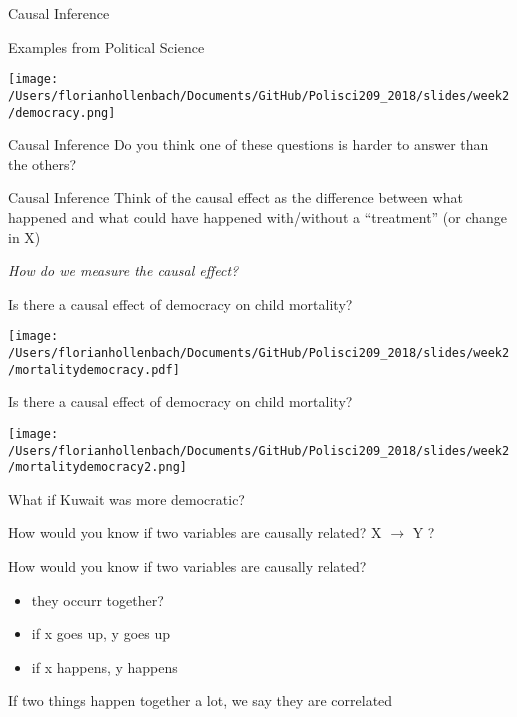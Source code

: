 \documentclass[presentation]{beamer}
\begin{document}
\begin{frame}[label={sec:org19d158c}]{Causal Inference}
\begin{block}{Examples from Political Science}
\begin{center}
\texttt{[image: /Users/florianhollenbach/Documents/GitHub/Polisci209\_2018/slides/week2/democracy.png]}
\end{center}
\end{block}
\end{frame}

\begin{frame}[label={sec:org6fd2cb8}]{Causal Inference}
Do you think one of these questions is harder to answer than the others?
\end{frame}

\begin{frame}[label={sec:org2395346}]{Causal Inference}
Think of the causal effect as the difference between what happened and what could have happened with/without a “treatment” (or change in X)

\emph{How do we measure the causal effect?}
\end{frame}

\begin{frame}[label={sec:org3ecdd11}]{Is there a causal effect of democracy on child mortality?}
\begin{center}
\texttt{[image: /Users/florianhollenbach/Documents/GitHub/Polisci209\_2018/slides/week2/mortalitydemocracy.pdf]}
\end{center}
\end{frame}

\begin{frame}[label={sec:org4b97a6d}]{Is there a causal effect of democracy on child mortality?}
\begin{center}
\texttt{[image: /Users/florianhollenbach/Documents/GitHub/Polisci209\_2018/slides/week2/mortalitydemocracy2.png]}
\end{center}
\begin{block}{What if Kuwait was more democratic?}
\end{block}
\end{frame}

\begin{frame}[label={sec:org2f4f3f6}]{How would you know if two variables are causally related?}
\LARGE{X $\rightarrow$ Y ?}
\end{frame}



\begin{frame}[label={sec:org5c27828}]{How would you know if two variables are causally related?}
\pause
\begin{itemize}
\item they occurr together?
\item if x goes up, y goes up
\item if x happens, y happens
\end{itemize}

\pause
If two things happen together a lot, we say they are correlated
\end{frame}
\end{document}
